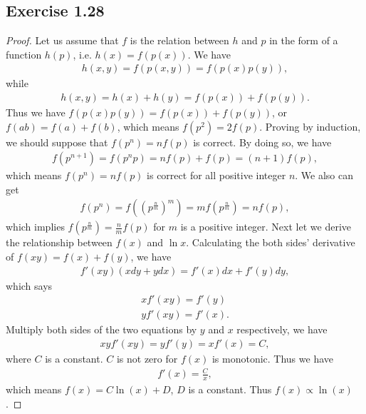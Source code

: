 \documentclass[11pt]{article}
\theoremstyle{definition}
\begin{document}
\subsection{Exercise 1.28}
\begin{proof}
Let us assume that $f$ is the relation between $h$ and $p$ in the form of a function $h(p)$, i.e. $h(x) = f(p(x))$. We have
\begin{align*}
h(x,y) = f(p(x,y)) = f(p(x)p(y)),
\end{align*}
while
\begin{align*}
h(x,y) = h(x) + h(y) = f(p(x)) + f(p(y)).
\end{align*}
Thus we have $f(p(x)p(y)) = f(p(x)) + f(p(y))$, or $f(ab) = f(a)+f(b)$, which means $f(p^2) = 2f(p)$. Proving by induction, we should suppose that $f(p^n) = nf(p)$ is correct. By doing so, we have
\begin{align*}
f(p^{n+1}) = f(p^{n}p) = nf(p) + f(p) = (n+1)f(p),
\end{align*}
which means $f(p^n) = nf(p)$ is correct for all positive integer $n$. We also can get
\begin{align*}
f(p^n) = f\left(\left(p^{\frac{n}{m}}\right)^m\right) = mf\left(p^{\frac{n}{m}}\right) = nf(p),
\end{align*}
which implies $f\left(p^{\frac{n}{m}}\right) = \frac{n}{m}f(p)$ for $m$ is a positive integer. Next let we derive the relationship between $f(x)$ and $\ln x$. Calculating the both sides' derivative of $f(xy) = f(x) + f(y)$, we have
\begin{align*}
f'(xy)(xdy + ydx) = f'(x)dx + f'(y)dy,
\end{align*}
which says
\begin{align*}
xf'(xy) = f'(y) \\
yf'(xy) = f'(x).
\end{align*}
Multiply both sides of the two equations by $y$ and $x$ respectively, we have
\begin{align*}
xyf'(xy) = yf'(y) = xf'(x) = C,
\end{align*}
where $C$ is a constant. $C$ is not zero for $f(x)$ is monotonic. Thus we have 
\begin{align*}
f'(x) = \frac{C}{x},
\end{align*}
which means $f(x) = C\ln(x) + D$, $D$ is a constant. Thus $f(x) \propto \ln(x)$.
\end{proof}
\end{document}
